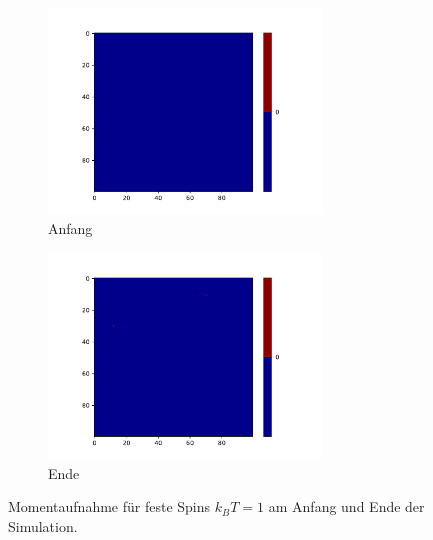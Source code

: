 \begin{figure}
  \begin{subfigure}{0.48\textwidth}
    \includegraphics[width = 0.8\textwidth]{A2/build/1kbt-a-fest_anfang.pdf}
    \caption{Anfang}
  \end{subfigure}
  \begin{subfigure}{0.48\textwidth}
    \includegraphics[width = 0.8\textwidth]{A2/build/1kbt-a-fest_ende.pdf}
    \caption{Ende}
  \end{subfigure}
  \caption{Momentaufnahme für feste Spins $k_B T =1$ am Anfang und Ende der Simulation. }
  \label{fig:fixOne}
\end{figure}

